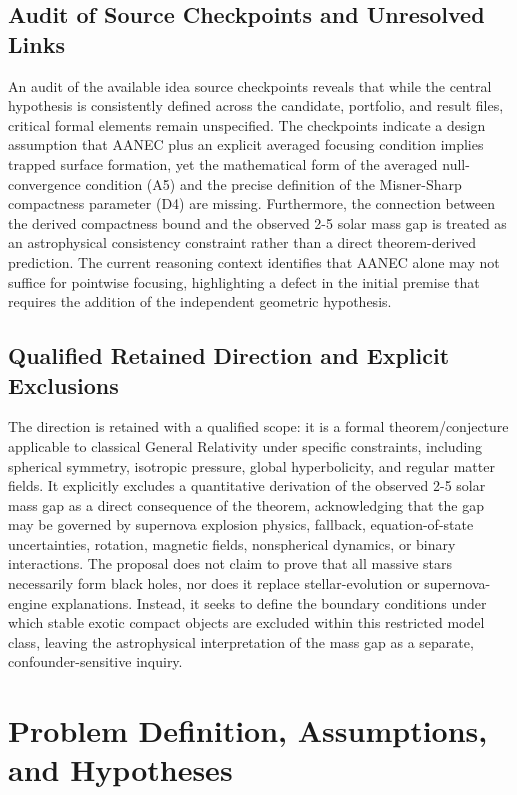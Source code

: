 \documentclass[conference]{IEEEtran}
\begin{document}
\subsection{Audit of Source Checkpoints and Unresolved Links}
An audit of the available idea source checkpoints reveals that while the central hypothesis is consistently defined across the candidate, portfolio, and result files, critical formal elements remain unspecified. The checkpoints indicate a design assumption that AANEC plus an explicit averaged focusing condition implies trapped surface formation, yet the mathematical form of the averaged null-convergence condition (A5) and the precise definition of the Misner-Sharp compactness parameter (D4) are missing. Furthermore, the connection between the derived compactness bound and the observed 2-5 solar mass gap is treated as an astrophysical consistency constraint rather than a direct theorem-derived prediction. The current reasoning context identifies that AANEC alone may not suffice for pointwise focusing, highlighting a defect in the initial premise that requires the addition of the independent geometric hypothesis.

\subsection{Qualified Retained Direction and Explicit Exclusions}
The direction is retained with a qualified scope: it is a formal theorem/conjecture applicable to classical General Relativity under specific constraints, including spherical symmetry, isotropic pressure, global hyperbolicity, and regular matter fields. It explicitly excludes a quantitative derivation of the observed 2-5 solar mass gap as a direct consequence of the theorem, acknowledging that the gap may be governed by supernova explosion physics, fallback, equation-of-state uncertainties, rotation, magnetic fields, nonspherical dynamics, or binary interactions. The proposal does not claim to prove that all massive stars necessarily form black holes, nor does it replace stellar-evolution or supernova-engine explanations. Instead, it seeks to define the boundary conditions under which stable exotic compact objects are excluded within this restricted model class, leaving the astrophysical interpretation of the mass gap as a separate, confounder-sensitive inquiry.

\section{Problem Definition, Assumptions, and Hypotheses}
\end{document}
